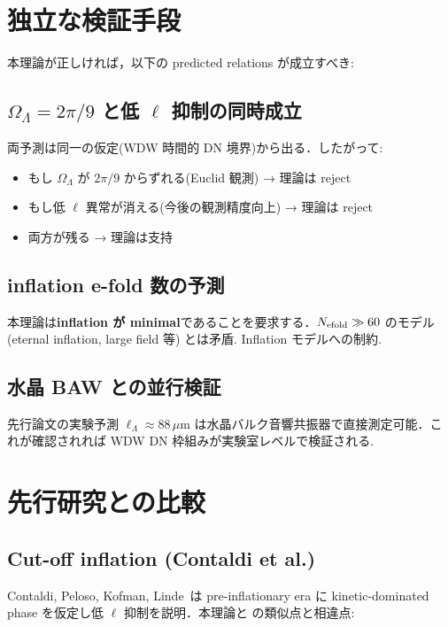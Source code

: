 \documentclass[11pt,a4paper]{article}
\begin{document}
\section{独立な検証手段}

本理論が正しければ，以下の predicted relations が成立すべき:

\subsection{$\Omega_\Lambda = 2\pi/9$ と低 $\ell$ 抑制の同時成立}

両予測は同一の仮定(WDW 時間的 DN 境界)から出る．したがって:
\begin{itemize}
\item もし $\Omega_\Lambda$ が $2\pi/9$ からずれる(Euclid 観測) →
理論は reject
\item もし低 $\ell$ 異常が消える(今後の観測精度向上) → 理論は reject
\item 両方が残る → 理論は支持
\end{itemize}

\subsection{inflation e-fold 数の予測}

本理論は\textbf{inflation が minimal}であることを要求する．$N_{\rm efold}
\gg 60$ のモデル (eternal inflation, large field 等) とは矛盾.
Inflation モデルへの制約.

\subsection{水晶 BAW との並行検証}

先行論文\cite{WDW-DN-paper}の実験予測 $\ell_\Lambda \approx 88\,\mu$m
は水晶バルク音響共振器で直接測定可能．これが確認されれば WDW DN
枠組みが実験室レベルで検証される.

\section{先行研究との比較}

\subsection{Cut-off inflation (Contaldi et al.)}

Contaldi, Peloso, Kofman, Linde~\cite{Contaldi2003}は pre-inflationary
era に kinetic-dominated phase を仮定し低 $\ell$ 抑制を説明．本理論と
の類似点と相違点:
\end{document}
